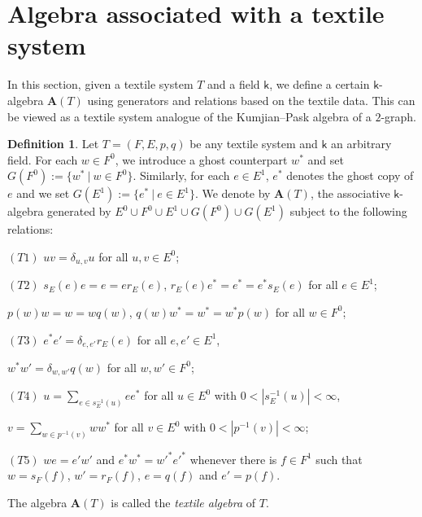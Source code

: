 \documentclass[a4paper,reqno,12pt]{amsart}
\theoremstyle{definition}
\newtheorem{dfn}[thm]{Definition}
\theoremstyle{remark}
\begin{document}
\section{Algebra associated with a textile system}\label{sec algebra of TS}
In this section, given a textile system $T$ and a field $\mathsf{k}$, we define a certain $\mathsf{k}$-algebra $\mathbf{A}(T)$ using generators and relations based on the textile data. This can be viewed as a textile system analogue of the Kumjian--Pask algebra of a $2$-graph.

\begin{dfn}\label{def the textile algebra}
Let $T=(F,E,p,q)$ be any textile system and $\mathsf{k}$ an arbitrary field. For each $w\in F^0$, we introduce a ghost counterpart $w^*$ and set $G(F^0):=\{w^*~|~w\in F^0\}$. Similarly, for each $e\in E^1$, $e^*$ denotes the ghost copy of $e$ and we set $G(E^1):=\{e^*~|~e\in E^1\}$. We denote by $\mathbf{A}(T)$, the associative $\mathsf{k}$-algebra generated by $E^0\cup F^0\cup E^1\cup G(F^0)\cup G(E^1)$ subject to the following relations:

$(T1)$ $uv=\delta_{u,v}u$ for all $u,v\in E^0$;

$(T2)$ $s_E(e)e=e=er_E(e)$, $r_E(e)e^*=e^*=e^*s_E(e)$ for all $e\in E^1$;

\hspace{0.9cm}$p(w)w=w=wq(w)$, $q(w)w^*=w^*=w^*p(w)$ for all $w\in F^0$;

$(T3)$ $e^*e'=\delta_{e,e'}r_E(e)$ for all $e,e'\in E^1$,

\hspace{0.9cm}$w^*w'=\delta_{w,w'}q(w)$ for all $w,w'\in F^0$;

$(T4)$ $u=\displaystyle{\sum_{e\in s_E^{-1}(u)}}ee^*$ for all $u\in E^0$ with $0<|s_E^{-1}(u)|< \infty$,

\hspace{0.9cm}$v=\displaystyle{\sum_{w\in p^{-1}(v)}} ww^*$ for all $v\in E^0$ with $0<|p^{-1}(v)|<\infty$;

$(T5)$ $we=e'w'$ and $e^*w^*=w'^*e'^*$ whenever there is $f\in F^1$ such that $w=s_F(f)$, $w'=r_F(f)$, $e=q(f)$ and $e'=p(f)$.

The algebra $\mathbf{A}(T)$ is called the \emph{textile algebra} of $T$.
\end{dfn}
\end{document}
